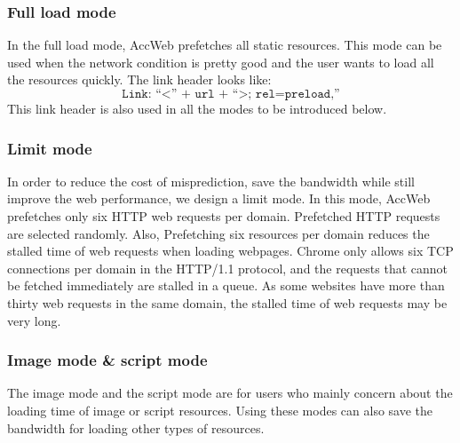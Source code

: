 

\subsubsection*{Full load mode}
In the full load mode, AccWeb prefetches all static resources. This mode can be used when the network condition is pretty good and the user wants to load all the resources quickly. The link header looks like:
\[\texttt{Link: ``<'' + url + ``>; rel=preload,''}\]
This link header is also used in all the modes to be introduced below.


\subsubsection*{Limit mode}
In order to reduce the cost of misprediction, save the bandwidth while still improve the web performance, we design a limit mode. In this mode, AccWeb prefetches only six HTTP web requests per domain. Prefetched HTTP requests are selected randomly. Also, Prefetching six resources per domain reduces the stalled time of web requests when loading webpages. Chrome only allows six TCP connections per domain in the HTTP/1.1 protocol, and the requests that cannot be fetched immediately are stalled in a queue. As some websites have more than thirty web requests in the same domain, the stalled time of web requests may be very long. 

\subsubsection*{Image mode \& script mode}
The image mode and the script mode are for users who mainly concern about the loading time of image or script resources. Using these modes can also save the bandwidth for loading other types of resources.
